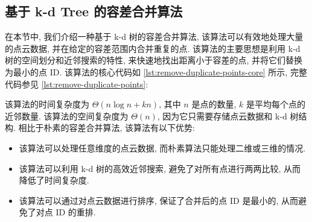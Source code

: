 \subsection{基于 k-d Tree 的容差合并算法}





在本节中, 我们介绍一种基于 k-d 树的容差合并算法, 该算法可以有效地处理大量的点云数据, 并在给定的容差范围内合并重复的点.
该算法的主要思想是利用 k-d 树的空间划分和近邻搜索的特性, 来快速地找出距离小于容差的点, 并将它们替换为最小的点 ID.
该算法的核心代码如 \cref{lst:remove-duplicate-points-core} 所示, 完整代码参见 \cref{lst:remove-duplicate-points}:


该算法的时间复杂度为 $\Theta(n \log{n} + k n)$, 其中 $n$ 是点的数量, $k$ 是平均每个点的近邻数量.
该算法的空间复杂度为 $\Theta(n)$, 因为它只需要存储点云数据和 k-d 树结构.
相比于朴素的容差合并算法, 该算法有以下优势:
\begin{itemize}
  \item 该算法可以处理任意维度的点云数据, 而朴素算法只能处理二维或三维的情况.
  \item 该算法可以利用 k-d 树的高效近邻搜索, 避免了对所有点进行两两比较, 从而降低了时间复杂度.
  \item 该算法可以通过对点云数据进行排序, 保证了合并后的点 ID 是最小的, 从而避免了对点 ID 的重排.
\end{itemize}

